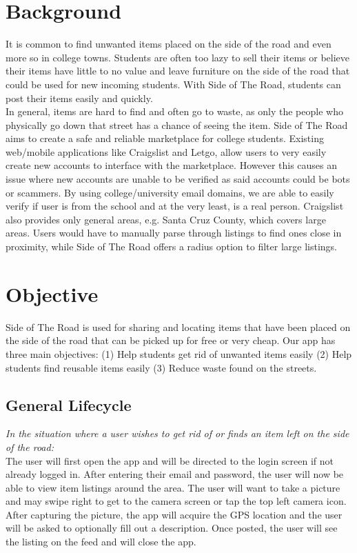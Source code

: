\documentclass[sigconf]{acmart}
\begin{document}
\section{Background}
It is common to find unwanted items placed on the side of the road and even more so in college towns. Students are often too lazy to sell their items or believe their items have little to no value and leave furniture on the side of the road that could be used for new incoming students. With Side of The Road, students can post their items easily and quickly. \\
In general, items are hard to find and often go to waste, as only the people who physically go down that street has a chance of seeing the item. Side of The Road aims to create a safe and reliable marketplace for college students. Existing  web/mobile applications like Craigslist and Letgo, allow users to very easily create new accounts to interface with the marketplace. However this causes an issue where new accounts are unable to be verified as said accounts could be bots or scammers. By using college/university email domains, we are able to easily verify if user is from the school and at the very least, is a real person. Craigslist also provides only general areas, e.g. Santa Cruz County, which covers large areas. Users would have to manually parse through listings to find ones close in proximity, while Side of The Road offers a radius option to filter large listings.

\section{Objective}
Side of The Road is used for sharing and locating items that have been placed on the side of the road that can be picked up for free or very cheap. Our app has three main objectives: (1) Help students get rid of unwanted items easily (2) Help students find reusable items easily (3) Reduce waste found on the streets. 

\subsection{General Lifecycle}

\emph{In the situation where a user wishes to get rid of or finds an item left on the side of the road:} \\ 
The user will first open the app and will be directed to the login screen if not already logged in. After entering their email and password, the user will now be able to view item listings around the area. The user will want to take a picture and may swipe right to get to the camera screen or tap the top left camera icon. After capturing the picture, the app will acquire the GPS location and the user will be asked to optionally fill out a description. Once posted, the user will see the listing on the feed and will close the app.
\end{document}
